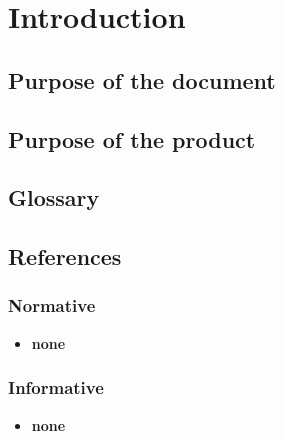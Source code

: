 \section{Introduction} 
\subsection{Purpose of the document}

\subsection{Purpose of the product}

\subsection{Glossary}

\subsection{References}

\subsubsection{Normative}
\begin{itemize}
	\item \textbf{none}
\end{itemize}

\subsubsection{Informative}
\begin{itemize}
	\item \textbf{none}
\end{itemize}